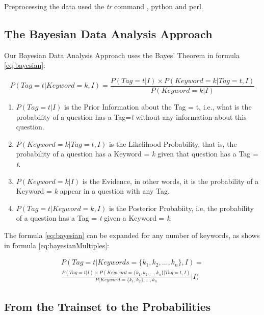 Preprocessing the data used the \emph{tr} command \citep{ss642013tr}, python and perl. 

\subsection{The Bayesian Data Analysis Approach}

Our Bayesian Data Analysis Approach uses the Bayes' Theorem in formula \ref{eq:bayesian}:

\begin{equation} \label{eq:bayesian}
    P(Tag = t | Keyword = k, I) = \frac{P(Tag = t | I) \times P(Keyword = k | Tag = t, I)}{P(Keyword = k | I)} 
\end{equation}

\begin{enumerate}
    \item $ P(Tag = t | I) $ is the Prior Information about the Tag = t, i.e., what is the probability of a question has a Tag=\emph{t} without any information about this question.
    \item $ P(Keyword = k | Tag = t, I) $ is the Likelihood Probability, that is, the probability of a question has a Keyword = \emph{k} given that question has a Tag = \emph{t}.
    \item $ P(Keyword = k | I) $ is the Evidence, in other words, it is the probability of a Keyword = \emph{k} appear in a question with any Tag.
    \item $ P(Tag = t | Keyword = k, I) $ is the Posterior Probabiity, i.e, the probability of a question has a Tag = \emph{t} given a Keyword = \emph{k}.
\end{enumerate}

The formula \ref{eq:bayesian} can be expanded for any number of keywords, as shows in formula \ref{eq:bayesianMultiples}:

\begin{multline} \label{eq:bayesianMultiples}
    P(Tag = t | Keywords = \{k_{1},k_{2}, \dots , k_{n}\} , I) =  \\
    \frac{P(Tag = t | I) \times P(Keyword = \{k_{1},k_{2}, \dots , k_{n}\} | Tag = t, I)}{P(Keyword = \{k_{1},k_{2}\}, \dots , k_{n}} | I) 
\end{multline}

\subsection{From the Trainset to the Probabilities}

